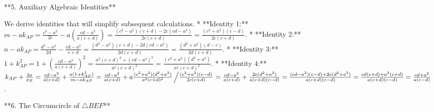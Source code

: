 \documentclass[12pt]{article}
\begin{document}
**5. Auxiliary Algebraic Identities**

We derive identities that will simplify subsequent calculations.
*   **Identity 1:** $m-ak_{AP} = \frac{c^2-a^2}{2c} - a\left(\frac{cd-a^2}{a(c+d)}\right) = \frac{(c^2-a^2)(c+d) - 2c(cd-a^2)}{2c(c+d)} = \frac{(c^2+a^2)(c-d)}{2c(c+d)}$.
*   **Identity 2:** $n-ak_{AP} = \frac{d^2-a^2}{2d} - \frac{cd-a^2}{c+d} = \frac{(d^2-a^2)(c+d) - 2d(cd-a^2)}{2d(c+d)} = \frac{(d^2+a^2)(d-c)}{2d(c+d)}$.
*   **Identity 3:** $1+k_{AP}^2 = 1+\left(\frac{cd-a^2}{a(c+d)}\right)^2 = \frac{a^2(c+d)^2+(cd-a^2)^2}{a^2(c+d)^2} = \frac{(c^2+a^2)(d^2+a^2)}{a^2(c+d)^2}$.
*   **Identity 4:** $k_{AP}+\frac{2a}{x_E} = \frac{cd-a^2}{a(c+d)} + \frac{a(1+k_{AP}^2)}{m-ak_{AP}} = \frac{cd-a^2}{a(c+d)} + a \frac{(c^2+a^2)(d^2+a^2)}{a^2(c+d)^2} \left/ \frac{(c^2+a^2)(c-d)}{2c(c+d)} \right. = \frac{cd-a^2}{a(c+d)} + \frac{2c(d^2+a^2)}{a(c+d)(c-d)} = \frac{(cd-a^2)(c-d)+2c(d^2+a^2)}{a(c+d)(c-d)} = \frac{cd(c+d)+a^2(c+d)}{a(c+d)(c-d)} = \frac{cd+a^2}{a(c-d)}$.

**6. The Circumcircle of $\triangle BEF$**
\end{document}
